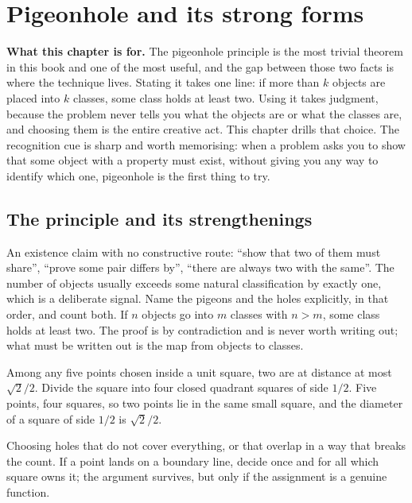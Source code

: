 \chapter{Pigeonhole and its strong forms}

\begin{orient}
\textbf{What this chapter is for.} The pigeonhole principle is the most trivial theorem in this book and one of the most useful, and the gap between those two facts is where the technique lives. Stating it takes one line: if more than $k$ objects are placed into $k$ classes, some class holds at least two. Using it takes judgment, because the problem never tells you what the objects are or what the classes are, and choosing them is the entire creative act. This chapter drills that choice. The recognition cue is sharp and worth memorising: when a problem asks you to show that some object with a property must exist, without giving you any way to identify which one, pigeonhole is the first thing to try.
\end{orient}

\section{The principle and its strengthenings}

\cue An existence claim with no constructive route: ``show that two of them must share'', ``prove some pair differs by'', ``there are always two with the same''. The number of objects usually exceeds some natural classification by exactly one, which is a deliberate signal.
\method Name the pigeons and the holes explicitly, in that order, and count both. If $n$ objects go into $m$ classes with $n>m$, some class holds at least two. The proof is by contradiction and is never worth writing out; what must be written out is the map from objects to classes.

\begin{worked}
Among any five points chosen inside a unit square, two are at distance at most $\sqrt2/2$. Divide the square into four closed quadrant squares of side $1/2$. Five points, four squares, so two points lie in the same small square, and the diameter of a square of side $1/2$ is $\sqrt2/2$.
\end{worked}

\begin{trap}
Choosing holes that do not cover everything, or that overlap in a way that breaks the count. If a point lands on a boundary line, decide once and for all which square owns it; the argument survives, but only if the assignment is a genuine function.
\end{trap}

